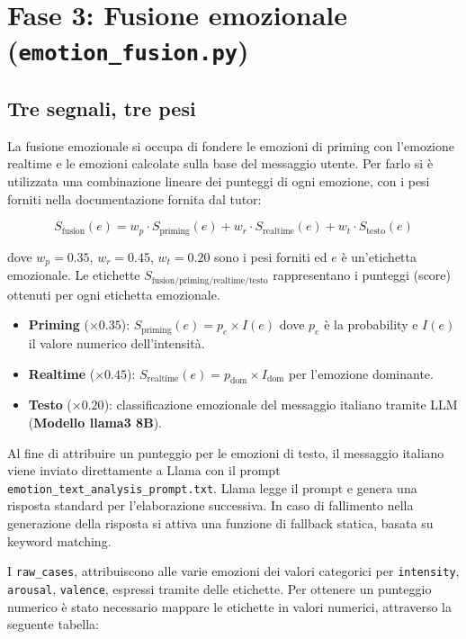 \documentclass[11pt]{report}
\begin{document}
 
\section{Fase 3: Fusione emozionale (\texttt{emotion\_fusion.py})}
 
\subsection{Tre segnali, tre pesi}

La fusione emozionale si occupa di fondere le emozioni di priming con l'emozione realtime e le emozioni calcolate sulla base del messaggio utente. Per farlo si è utilizzata una combinazione lineare dei punteggi di ogni emozione, con i pesi forniti nella documentazione fornita dal tutor:
 
\begin{equation}
    S_\text{fusion}(e) = w_p \cdot S_\text{priming}(e) + w_r \cdot S_\text{realtime}(e) + w_t \cdot S_\text{testo}(e)
    \label{eq:fusion}
\end{equation}
 
dove $w_p = 0.35$, $w_r = 0.45$, $w_t = 0.20$ sono i pesi forniti ed $e$ è un'etichetta emozionale. Le etichette $S_\text{fusion/priming/realtime/testo}$ rappresentano i punteggi (score) ottenuti per ogni etichetta emozionale.
 
\begin{itemize}
    \item \textbf{Priming} ($\times 0.35$): $S_\text{priming}(e) = p_e \times I(e)$ dove $p_e$ è la probability e $I(e)$ il valore numerico dell'intensità.
    \item \textbf{Realtime} ($\times 0.45$): $S_\text{realtime}(e) = p_\text{dom} \times I_\text{dom}$ per l'emozione dominante.
    \item \textbf{Testo} ($\times 0.20$): classificazione emozionale del messaggio italiano tramite LLM (\textbf{Modello llama3 8B}).
\end{itemize}

Al fine di attribuire un punteggio per le emozioni di testo, il messaggio italiano viene inviato direttamente a Llama con il prompt \texttt{emotion\_text\_analysis\_prompt.txt}. Llama legge il prompt e genera una risposta standard per l'elaborazione successiva. In caso di fallimento nella generazione della risposta si attiva una funzione di fallback statica, basata su keyword matching.
 
I \texttt{raw\_cases}, attribuiscono alle varie emozioni dei valori categorici per \texttt{intensity}, \texttt{arousal}, \texttt{valence}, espressi tramite delle etichette. Per ottenere un punteggio numerico è stato necessario mappare le etichette in valori numerici, attraverso la seguente tabella:
 
\end{document}

